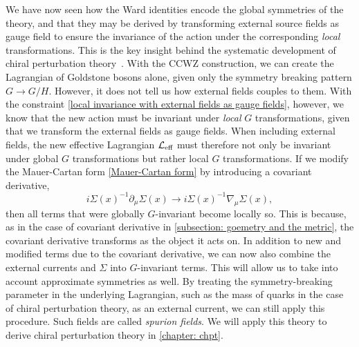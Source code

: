 We have now seen how the Ward identities encode the global symmetries of the theory, and that they may be derived by transforming external source fields as gauge field to ensure the invariance of the action under the corresponding \emph{local} transformations.
This is the key insight behind the systematic development of chiral perturbation theory~\autocite{gasserChiralPerturbationTheory1984,gasserChiralPerturbationTheory1985,leutwylerFoundationsChiralPerturbation1994}.
With the CCWZ construction, we can create the Lagrangian of Goldstone bosons alone, given only the symmetry breaking pattern $G \rightarrow G/H$.
However, it does not tell us how external fields couples to them.
With the constraint \autoref{local invariance with external fields as gauge fields}, however, we know that the new action must be invariant under \emph{local} $G$ transformations, given that we transform the external fields as gauge fields.
When including external fields, the new effective Lagrangian $\mathcal{L}_\text{eff}$ must therefore not only be invariant under global $G$ transformations but rather local $G$ transformations.
If we modify the Mauer-Cartan form \autoref{Mauer-Cartan form} by introducing a covariant derivative,
%
\begin{equation}
    i\Sigma(x)^{-1} \partial_\mu \Sigma(x)
    \rightarrow i\Sigma(x)^{-1} \nabla_\mu \Sigma(x),
\end{equation}
%
then all terms that were globally $G$-invariant become locally so.
This is because, as in the case of covariant derivative in \autoref{subsection: goemetry and the metric}, the covariant derivative transforms as the object it acts on.
In addition to new and modified terms due to the covariant derivative, we can now also combine the external currents and $\Sigma$ into $G$-invariant terms.
This will allow us to take into account approximate symmetries as well.
By treating the symmetry-breaking parameter in the underlying Lagrangian, such as the mass of quarks in the case of chiral perturbation theory, as an external current, we can still apply this procedure.
Such fields are called \emph{spurion fields}.
We will apply this theory to derive chiral perturbation theory in \autoref{chapter: chpt}.

